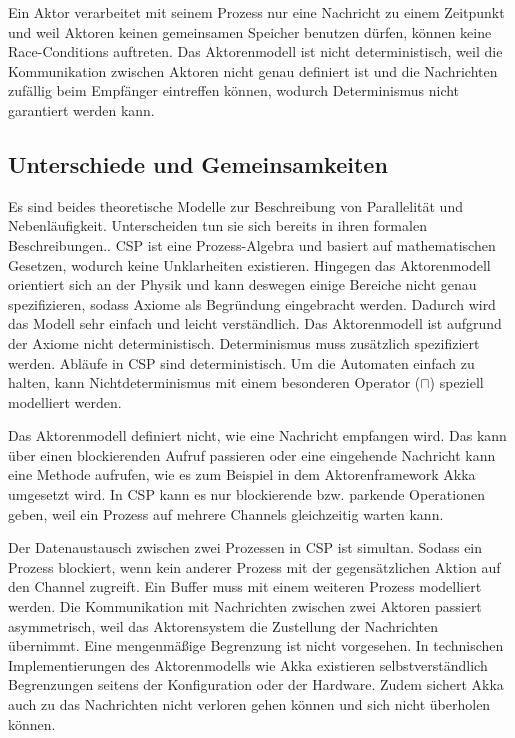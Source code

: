 Ein Aktor verarbeitet mit seinem Prozess nur eine Nachricht zu einem Zeitpunkt und weil Aktoren keinen gemeinsamen Speicher benutzen dürfen, können keine Race-Conditions auftreten.
Das Aktorenmodell ist nicht deterministisch, weil die Kommunikation zwischen Aktoren nicht genau definiert ist und die Nachrichten zufällig beim Empfänger eintreffen können, wodurch Determinismus nicht garantiert werden kann.

\subsection{Unterschiede und Gemeinsamkeiten}
Es sind beides theoretische Modelle zur Beschreibung von Parallelität und Nebenläufigkeit. Unterscheiden tun sie sich bereits in ihren formalen Beschreibungen..
\ac{CSP} ist eine Prozess-Algebra und basiert auf mathematischen Gesetzen, wodurch keine Unklarheiten existieren. Hingegen das Aktorenmodell orientiert sich an der Physik und kann deswegen einige Bereiche nicht genau spezifizieren, sodass Axiome als Begründung eingebracht werden. Dadurch wird das Modell sehr einfach und leicht verständlich. Das Aktorenmodell ist aufgrund der Axiome nicht deterministisch. Determinismus muss zusätzlich spezifiziert werden. Abläufe in \ac{CSP} sind deterministisch. Um die Automaten einfach zu halten, kann Nichtdeterminismus mit einem besonderen Operator ($\sqcap$) speziell modelliert werden.

Das Aktorenmodell definiert nicht, wie eine Nachricht empfangen wird. Das kann über einen blockierenden Aufruf passieren oder eine eingehende Nachricht kann eine Methode aufrufen, wie es zum Beispiel in dem Aktorenframework Akka umgesetzt wird. In \ac{CSP} kann es nur blockierende bzw. parkende Operationen geben, weil ein Prozess auf mehrere Channels gleichzeitig warten kann.

Der Datenaustausch zwischen zwei Prozessen in \ac{CSP} ist simultan. Sodass ein Prozess blockiert, wenn kein anderer Prozess mit der gegensätzlichen Aktion auf den Channel zugreift. Ein Buffer muss mit einem weiteren Prozess modelliert werden. Die Kommunikation mit Nachrichten zwischen zwei Aktoren passiert asymmetrisch, weil das Aktorensystem die Zustellung der Nachrichten übernimmt. Eine mengenmäßige Begrenzung ist nicht vorgesehen. In technischen Implementierungen des Aktorenmodells wie Akka existieren selbstverständlich Begrenzungen seitens der Konfiguration oder der Hardware. Zudem sichert Akka auch zu das Nachrichten nicht verloren gehen können und sich nicht überholen können.

